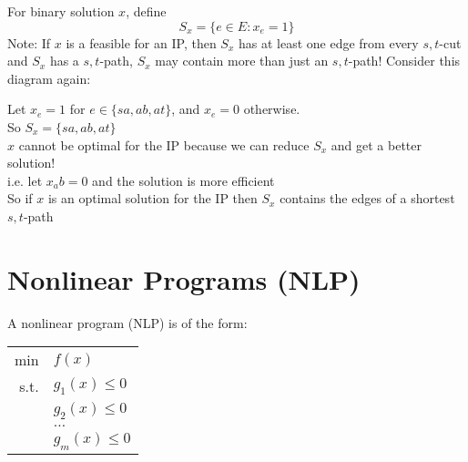 \documentclass[letterpaper, 12pt]{article}
\newcommand{\red}[1]{{\color{red}{#1}}}
\begin{document}
    For binary solution $x$, define\\
    $$S_x = \{e \in E : x_e = 1\}$$
    Note: If $x$ is a feasible for an IP, then $S_x$ has at least one edge from every $s,t$-cut and $S_x$ has a $s,t$-path, \red{but} $S_x$ may contain more than just an $s,t$-path!
    \pagebreak
    Consider this diagram again:
    \begin{center}
    \end{center}
    Let $x_e = 1$ for $e \in \{sa, ab, at\}$, and $x_e = 0$ otherwise.\\
    So $S_x = \{sa, ab, at\}$\\
    $x$ cannot be optimal for the IP because we can reduce $S_x$ and get a better solution!\\
    i.e. let $x_ab = 0$ and the solution is more efficient\\
    \bigskip
    So if $x$ is an optimal solution for the IP \red{and $c_e \geq 0$ for all $e \in E$} then $S_x$ contains the edges of a shortest $s,t$-path

    \pagebreak
    \section{Nonlinear Programs (NLP)}
    A nonlinear program (NLP) is of the form:\\
    \begin{center}
        \begin{tabular}{rl}
            min & $f(x)$\\
            s.t. & $g_1(x) \leq 0$\\
            & $g_2(x) \leq 0$\\
            & $\dots$\\
            & $g_m(x) \leq 0$\\
        \end{tabular}
    \end{center}

    
\end{document}
